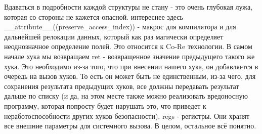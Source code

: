 \begin{flushleft}
Вдаваться в подробности каждой структуры не стану - это очень глубокая лужа, которая со стороны не кажется опасной. интереснее здесь \_\_attribute\_\_((preserve\_access\_index)) - макрос для компилятора и для дальнейшей релокации данных, который как раз магически определяет неоднозначное определение полей. Это относится к Co-Re технологии. В самом начале хука мы возвращаем ret - возвращенное значение предыдущего такого же хука. Это необходимо из-за того, что при внесении нашего хука, он добавляется в очередь на вызов хуков. То есть он может быть не единственным, из-за чего, для сохранения результата предыдущих хуков, все должны передавать результат дальше по списку (и да, на этом месте также можно реализовать вредоносную программу, которая попросту будет нарушать это, что приведет к неработоспособности других хуков безопасности). regs - регистры. Они хранят все внешние параметры для системного вызова. В целом, остальное всё понятно.

\end{flushleft}